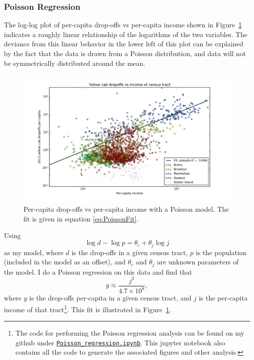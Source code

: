 \documentclass[11pt]{article}
\newcommand{\fref}[1]{Figure~\ref{fig:#1}}
\begin{document}
\subsubsection{Poisson Regression}



The log-log plot  of per-capita drop-offs vs per-capita income shown in \fref{dropoffsvsincome} indicates a roughly linear relationship of the logarithms of the two variables. The deviance from this linear behavior in the lower left of this plot can be explained by the fact that the data is drawn from a Poisson distribution, and data will not be symmetrically distributed around the mean.
\begin{figure}[h]
  \centering
  \includegraphics[width=\textwidth]{2013count_dropoffs_vs_income_low_car_poisson.png}
  \caption{Per-capita drop-offs vs per-capita income with a Poisson model. The fit is given in equation \ref{eq:PoissonFit}.\label{fig:dropoffsvsincome}}
\end{figure}
Using
\begin{equation}
  \log d - \log p = \theta_c + \theta_j \log j
\end{equation}
as my model, where $d$ is the drop-offs in a given census tract, $p$ is the population (included in the model as an offset), and $\theta_c$ and $\theta_j$ are unknown parameters of the model.
I do a Poisson regression on this data and find that 
\begin{equation}
  \label{eq:PoissonFit}
  y\approx \frac{j^2}{4.7\times 10^8},
\end{equation}
where $y$ is the drop-offs per-capita in a given census tract, and $j$ is the per-capita income of that tract\footnote{The code for performing the Poisson regression analysis can be found on my github under \href{https://github.com/ThomasProctor/Slide-Rule-Data-Intensive/blob/master/DataStory/FinalFiles/Poisson_regression.ipynb}{\texttt{Poisson\_regression.ipynb}}. This jupyter notebook also contains all the code to generate the associated figures and other analysis.}.
This fit is illustrated in \fref{dropoffsvsincome}.
\end{document}

